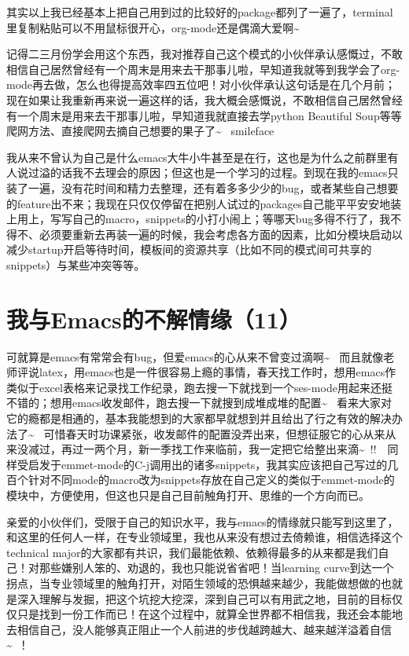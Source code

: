 \documentclass[12pt]{book}
\begin{document}
其实以上我已经基本上把自己用到过的比较好的package都列了一遍了，terminal里复制粘贴可以不用鼠标很开心，org-mode还是偶滴大爱啊\textasciitilde{}~

记得二三月份学会用这个东西，我对推荐自己这个模式的小伙伴承认感慨过，不敢相信自己居然曾经有一个周末是用来去干那事儿啦，早知道我就等到我学会了org-mode再去做，怎么也得提高效率四五位吧！对小伙伴承认这句话是在几个月前；现在如果让我重新再来说一遍这样的话，我大概会感慨说，不敢相信自己居然曾经有一个周末是用来去干那事儿啦，早知道我就直接去学python Beautiful Soup等等爬网方法、直接爬网去摘自己想要的果子了\textasciitilde{}~ smileface

我从来不曾认为自己是什么emacs大牛小牛甚至是在行，这也是为什么之前群里有人说过溢的话我不去理会的原因；但这也是一个学习的过程。到现在我的emacs只装了一遍，没有花时间和精力去整理，还有着多多少少的bug，或者某些自己想要的feature出不来；我现在只仅仅停留在把别人试过的packages自己能平平安安地装上用上，写写自己的macro，snippets的小打小闹上；等哪天bug多得不行了，我不得不、必须要重新去再装一遍的时候，我会考虑各方面的因素，比如分模块启动以减少startup开启等待时间，模板间的资源共享（比如不同的模式间可共享的snippets）与某些冲突等等。


\section{我与Emacs的不解情缘（11）}
\label{sec-6-11}

可就算是emacs有常常会有bug，但爱emacs的心从来不曾变过滴啊\textasciitilde{}~ 而且就像老师评说latex，用emacs也是一件很容易上瘾的事情，春天找工作时，想用emacs作类似于excel表格来记录找工作纪录，跑去搜一下就找到一个ses-mode用起来还挺不错的；想用emacs收发邮件，跑去搜一下就搜到成堆成堆的配置\textasciitilde{}~ 看来大家对它的瘾都是相通的，基本我能想到的大家都早就想到并且给出了行之有效的解决办法了\textasciitilde{}~ 可惜春天时功课紧张，收发邮件的配置没弄出来，但想征服它的心从来从来没减过，再过一两个月，新一季找工作来临前，我一定把它给整出来滴\textasciitilde{}~!!　同样受启发于emmet-mode的C-j调用出的诸多snippets，我其实应该把自己写过的几百个针对不同mode的macro改为snippets存放在自己定义的类似于emmet-mode的模块中，方便使用，但这也只是自己目前触角打开、思维的一个方向而已。

亲爱的小伙伴们，受限于自己的知识水平，我与emacs的情缘就只能写到这里了，和这里的任何人一样，在专业领域里，我也从来没有想过去倚赖谁，相信选择这个technical major的大家都有共识，我们最能依赖、依赖得最多的从来都是我们自己！对那些嫌别人笨的、劝退的，我也只能说省省吧！当learning curve到达一个拐点，当专业领域里的触角打开，对陌生领域的恐惧越来越少，我能做想做的也就是深入理解与发掘，把这个坑挖大挖深，深到自己可以有用武之地，目前的目标仅仅只是找到一份工作而已！在这个过程中，就算全世界都不相信我，我还会本能地去相信自己，没人能够真正阻止一个人前进的步伐越跨越大、越来越洋溢着自信\textasciitilde{}~！
\end{document}
